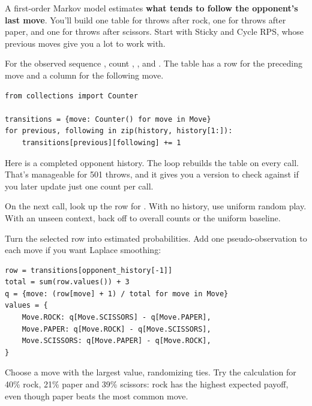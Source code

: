 \documentclass[11pt]{article}
\begin{document}
\thispagestyle{plain}


\clearpage

\clearpage
{}

\begin{context}
A first-order Markov model estimates \textbf{what tends to follow the opponent's last move}. You'll build one table for throws after rock, one for throws after paper, and one for throws after scissors. Start with Sticky and Cycle RPS, whose previous moves give you a lot to work with.

\end{context}


For the observed sequence , count , ,  and . The table has a row for the preceding move and a column for the following move.


\begin{lstlisting}[style=python]
from collections import Counter

transitions = {move: Counter() for move in Move}
for previous, following in zip(history, history[1:]):
    transitions[previous][following] += 1
\end{lstlisting}

Here  is a completed opponent history. The loop rebuilds the table on every call. That's manageable for 501 throws, and it gives you a version to check against if you later update just one count per call.


On the next call, look up the row for . With no history, use uniform random play. With an unseen context, back off to overall counts or the uniform baseline.



Turn the selected row into estimated probabilities. Add one pseudo-observation to each move if you want Laplace smoothing:


\begin{lstlisting}[style=python]
row = transitions[opponent_history[-1]]
total = sum(row.values()) + 3
q = {move: (row[move] + 1) / total for move in Move}
values = {
    Move.ROCK: q[Move.SCISSORS] - q[Move.PAPER],
    Move.PAPER: q[Move.ROCK] - q[Move.SCISSORS],
    Move.SCISSORS: q[Move.PAPER] - q[Move.ROCK],
}
\end{lstlisting}

Choose a move with the largest value, randomizing ties. Try the calculation for 40\% rock, 21\% paper and 39\% scissors: rock has the highest expected payoff, even though paper beats the most common move.
\end{document}
